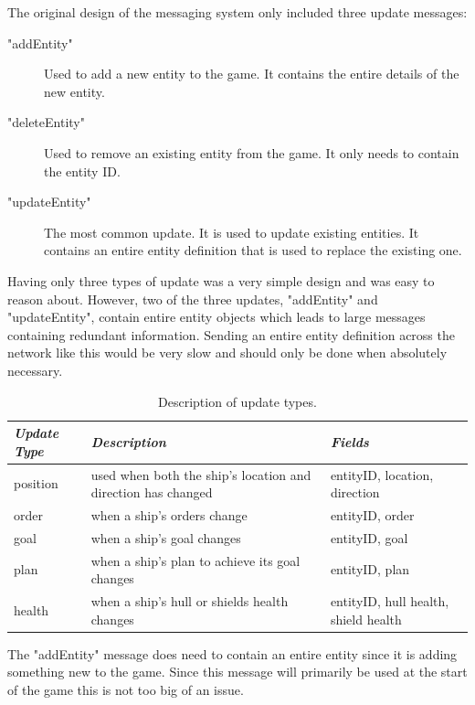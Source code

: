 The original design of the messaging system only included three update messages:

\begin{description}
	\item["addEntity"] Used to add a new entity to the game. It contains the entire details of the new entity.
	\item["deleteEntity"] Used to remove an existing entity from the game. It only needs to contain the entity ID.
	\item["updateEntity"] The most common update. It is used to update existing entities. It contains an entire entity definition that is used to replace the existing one.
\end{description}

Having only three types of update was a very simple design and was easy to reason about. However, two of the three updates, "addEntity" and "updateEntity", contain entire entity objects which leads to large messages containing redundant information. Sending an entire entity definition across the network like this would be very slow and should only be done when absolutely necessary.

\begin{table}[t]
    \begin{tabular}{p{5em} p{15em} p{6em}}
    \toprule
    \emph{Update Type} & \emph{Description} & \emph{Fields} \\
    \midrule
    position & used when both the ship's location and direction has changed & entityID, location, direction \\
    order & when a ship's orders change & entityID, order \\
    goal & when a ship's goal changes & entityID, goal \\
    plan & when a ship's plan to achieve its goal changes & entityID, plan \\
    health & when a ship's hull or shields health changes & entityID, hull health, shield health \\ 
    \bottomrule
    \end{tabular}
    	\vspace{1em}
	\caption[Message update types]{Description of update types.}
	\label{tab:updateMessageTypes}
\end{table}

The "addEntity" message does need to contain an entire entity since it is adding something new to the game. Since this message will primarily be used at the start of the game this is not too big of an issue.

